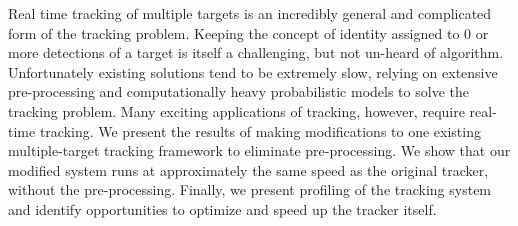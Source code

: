 
Real time tracking of multiple targets is an incredibly general and complicated form of the tracking problem. Keeping the concept
of identity assigned to 0 or more detections of a target is itself a challenging, but not un-heard of algorithm. Unfortunately existing
solutions tend to be extremely slow, relying on extensive pre-processing and computationally heavy probabilistic models to solve
the tracking problem. Many exciting applications of tracking, however, require real-time tracking. We present the results of
making modifications to one existing multiple-target tracking framework to eliminate pre-processing. We show that our modified
system runs at approximately the same speed as the original tracker, without the pre-processing. Finally, we present profiling of
the tracking system and identify opportunities to optimize and speed up the tracker itself.